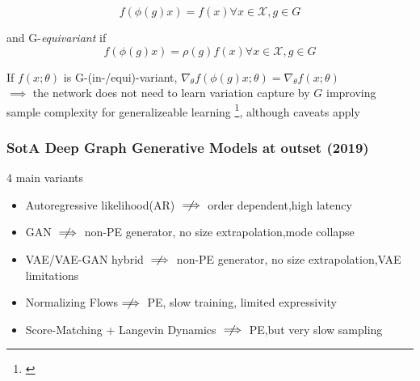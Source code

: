 \documentclass[./presentation.tex]{subfiles}
\begin{document}
\begin{frame}[label=working,t]
{    \begin{equation}
  f(\phi(g)x)=f(x)\forall x \in \mathcal{X},g\in G\nonumber
    \end{equation}

  and G-\emph{equivariant} if
  \begin{equation}
  f(\phi(g)x)=\rho(g)f(x) \forall x \in\mathcal{X},g\in G\nonumber
  \end{equation}

  If $f(x;\theta)$ is G-(in-/equi)-variant, $\nabla_\theta f(\phi(g)x;\theta)=\nabla_\theta f(x;\theta)$\\

  $\implies$ the network does not need to learn variation capture by $G$ improving sample complexity for generalizeable learning
  \footnote[frame]{\cite{elesedyProvablyStrictGeneralisation2021b}}, although caveats apply
}
\end{frame}

\begin{frame}[label=working]
  \frametitle{SotA Deep Graph Generative Models at outset (2019)}
  \small
  4 main variants
  \begin{itemize}
    \item Autoregressive likelihood(AR) $\centernot\implies$ order dependent,high latency%
    \item GAN %
      $\centernot\implies$ non-PE generator, no size extrapolation,mode collapse
    \item VAE/VAE-GAN hybrid%
      $\centernot\implies$ non-PE generator, no size extrapolation,VAE limitations %
    \item Normalizing Flows$\centernot\implies$ PE, slow training, limited expressivity
    \item Score-Matching + Langevin Dynamics  $\centernot\implies$ PE,but very slow sampling
  \end{itemize}
\end{frame}
\end{document}
